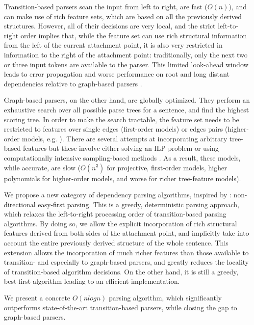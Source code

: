 \documentclass[11pt]{article}
\begin{document}
Transition-based parsers scan the input from left to right, are fast ($O(n)$), and can make use of rich feature sets, which are based on all the previously derived structures.  However, all of their decisions are very local, and the strict left-to-right order implies that, while the feature set can use rich structural information from the left of the current attachment point, it is also very restricted in information to the right of the attachment point: traditionally, only the next two or three input tokens are available to the parser.  This limited look-ahead window leads to error propagation and worse performance on root and long distant dependencies relative to graph-based parsers \cite{nivre-mcdonald-errors}.

Graph-based parsers, on the other hand, are globally optimized.  They perform an exhaustive search over all possible parse trees for a sentence, and find the highest scoring tree.  In order to make the search tractable, the feature set needs to be restricted to features over single edges (first-order models) or edges pairs (higher-order models, e.g. \cite{mst2nd,xavier}).  There are several attempts at incorporating arbitrary tree-based features but these involve either solving an ILP problem \cite{ilp} or using computationally intensive sampling-based methods \cite{global-gibbs}.  As a result, these models, while accurate, are slow ($O(n^3)$ for projective, first-order models, higher polynomials for higher-order models, and worse for richer tree-feature models).

We propose a new category of dependency parsing algorithms, inspired by \cite{shen-bidi}: non-directional easy-first parsing.  This is a greedy, deterministic parsing approach, which relaxes the left-to-right processing order of transition-based parsing algorithms.  By doing so, we allow the explicit incorporation of rich structural features derived from both sides of the attachment point, and implicitly take into account the entire previously derived structure of the whole sentence.  This extension allows the incorporation of much richer features than those available to transition- and especially to graph-based parsers, and greatly reduces the locality of transition-based algorithm decisions.  On the other hand, it is still a greedy, best-first algorithm leading to an efficient implementation.

We present a concrete $O(nlogn)$ parsing algorithm, which significantly outperforms state-of-the-art transition-based parsers, while closing the gap to graph-based parsers.  
\end{document}
